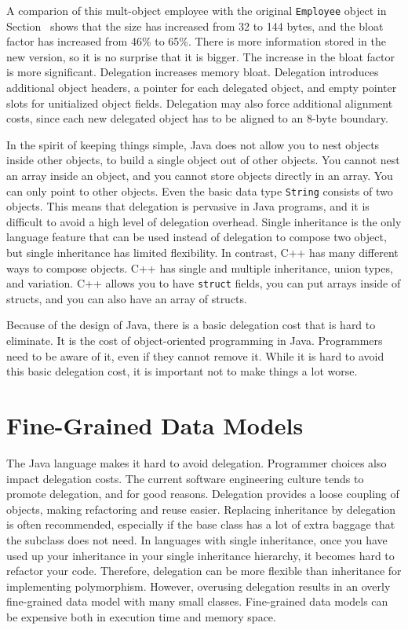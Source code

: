 A comparion of this mult-object employee with the original \texttt{Employee} object in Section~\cite{CostOfObects} shows that the size has increased from 32 to 144 bytes, and the bloat factor has increased from 46\% to 65\%. There is more information stored in the new version, so it is no surprise that it is bigger. The increase in the bloat factor is more significant. Delegation increases memory bloat. Delegation introduces additional object headers, a pointer for each delegated object, and empty pointer slots for unitialized object fields. Delegation may also force additional alignment costs, since each new delegated object has to be aligned to an 8-byte boundary. 

In the spirit of keeping things simple, Java does not allow you to nest objects inside other objects, to build a single object out of other objects. You cannot nest an array inside an object, and you cannot store objects directly in an array.  You can only point to other objects. Even the basic data type \texttt{String} consists of two objects. This means that delegation is pervasive in Java programs, and it is difficult to avoid a high level of delegation overhead. Single inheritance is the only language feature that can be used instead of delegation to compose two object, but single inheritance has limited flexibility.  In contrast, C++ has many different ways to compose objects. C++ has single and multiple inheritance, union types, and variation. C++ allows you to have \texttt{struct} fields, you can put arrays inside of structs, and you can also have an array of structs.  

Because of the design of Java, there is a basic delegation cost that is hard to eliminate. It is the cost of object-oriented programming in Java. Programmers need to be aware of it, even if they cannot remove it. While it is hard to avoid this basic delegation cost, it is important not to make things a lot worse. 

\section{Fine-Grained Data Models}
\label{fine-grained-data-models}

The Java language makes it hard to avoid delegation. Programmer choices also impact delegation costs.  The current software engineering culture tends to promote delegation, and for good reasons. Delegation provides a loose coupling of objects, making refactoring and reuse easier. Replacing inheritance by delegation is often recommended, especially if the base class has a lot of extra baggage that the subclass does not need. In languages with single inheritance, once you have used up your inheritance in your single inheritance hierarchy, it becomes hard to refactor your code. Therefore, delegation can be more flexible than inheritance for implementing polymorphism. However, overusing delegation results in an overly fine-grained data model with many small classes. Fine-grained data models can be expensive both in execution time and memory space. 

